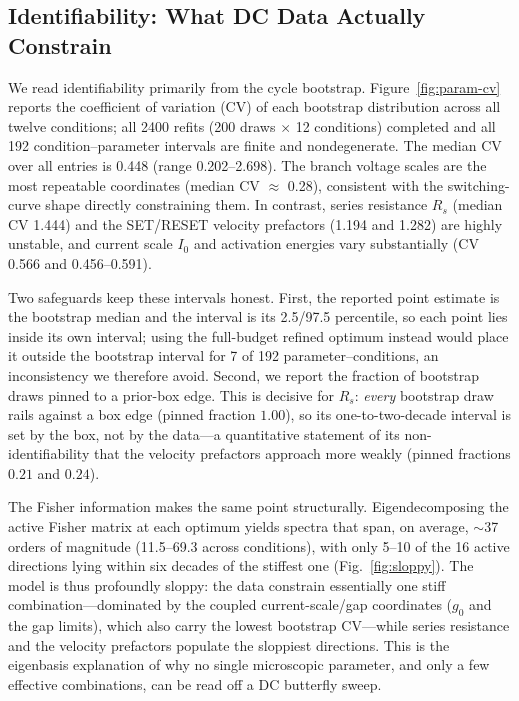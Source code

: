 \documentclass[journal]{IEEEtran}
\begin{document}
\subsection{Identifiability: What DC Data Actually Constrain}
\label{sec:res-ident}

We read identifiability primarily from the cycle bootstrap.
Figure~\ref{fig:param-cv} reports the coefficient of variation (CV) of each
bootstrap distribution across all twelve conditions; all 2400 refits (200
draws $\times$ 12 conditions) completed and all 192 condition--parameter
intervals are finite and nondegenerate.  The median CV over all entries is
0.448 (range 0.202--2.698).  The branch voltage scales are the most
repeatable coordinates (median CV $\approx$ 0.28), consistent with the
switching-curve shape directly constraining them.  In contrast, series
resistance $R_s$ (median CV 1.444) and the SET/RESET velocity prefactors
(1.194 and 1.282) are highly unstable, and current scale $I_0$ and activation
energies vary substantially (CV 0.566 and 0.456--0.591).

Two safeguards keep these intervals honest.  First, the reported point estimate
is the bootstrap median and the interval is its 2.5/97.5 percentile, so each
point lies inside its own interval; using the full-budget refined optimum
instead would place it outside the bootstrap interval for 7 of 192
parameter--conditions, an inconsistency we therefore avoid.  Second, we report
the fraction of bootstrap draws pinned to a prior-box edge.  This is decisive
for $R_s$: \emph{every} bootstrap draw rails against a box edge (pinned
fraction $1.00$), so its one-to-two-decade interval is set by the box, not by
the data---a quantitative statement of its non-identifiability that the velocity
prefactors approach more weakly (pinned fractions $0.21$ and $0.24$).

The Fisher information makes the same point structurally.  Eigendecomposing the
active Fisher matrix at each optimum yields spectra that span, on average,
$\sim$37 orders of magnitude (11.5--69.3 across conditions), with only 5--10 of
the 16 active directions lying within six decades of the stiffest one
(Fig.~\ref{fig:sloppy}).  The model is thus profoundly sloppy: the data
constrain essentially one stiff combination---dominated by the coupled
current-scale/gap coordinates ($g_0$ and the gap limits), which also carry the
lowest bootstrap CV---while series resistance and the velocity prefactors
populate the sloppiest directions.  This is the eigenbasis explanation of why
no single microscopic parameter, and only a few effective combinations, can be
read off a DC butterfly sweep.
\end{document}
